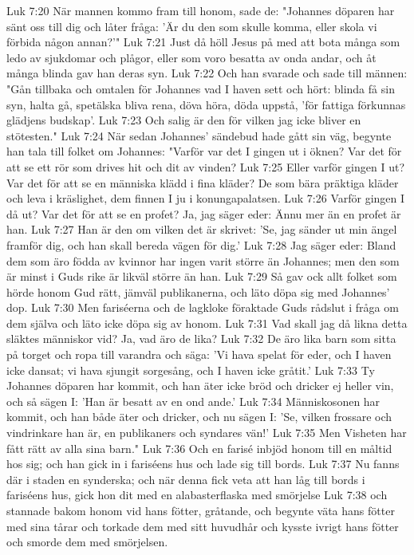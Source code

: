 Luk 7:20  När mannen kommo fram till honom, sade de: "Johannes döparen har sänt oss till dig och låter fråga: 'Är du den som skulle komma, eller skola vi förbida någon annan?'"
Luk 7:21  Just då höll Jesus på med att bota många som ledo av sjukdomar och plågor, eller som voro besatta av onda andar, och åt många blinda gav han deras syn.
Luk 7:22  Och han svarade och sade till männen: "Gån tillbaka och omtalen för Johannes vad I haven sett och hört: blinda få sin syn, halta gå, spetälska bliva rena, döva höra, döda uppstå, 'för fattiga förkunnas glädjens budskap'.
Luk 7:23  Och salig är den för vilken jag icke bliver en stötesten."
Luk 7:24  När sedan Johannes' sändebud hade gått sin väg, begynte han tala till folket om Johannes: "Varför var det I gingen ut i öknen? Var det för att se ett rör som drives hit och dit av vinden?
Luk 7:25  Eller varför gingen I ut? Var det för att se en människa klädd i fina kläder? De som bära präktiga kläder och leva i kräslighet, dem finnen I ju i konungapalatsen.
Luk 7:26  Varför gingen I då ut? Var det för att se en profet? Ja, jag säger eder: Ännu mer än en profet är han.
Luk 7:27  Han är den om vilken det är skrivet: 'Se, jag sänder ut min ängel framför dig, och han skall bereda vägen för dig.'
Luk 7:28  Jag säger eder: Bland dem som äro födda av kvinnor har ingen varit större än Johannes; men den som är minst i Guds rike är likväl större än han.
Luk 7:29  Så gav ock allt folket som hörde honom Gud rätt, jämväl publikanerna, och läto döpa sig med Johannes' dop.
Luk 7:30  Men fariséerna och de lagkloke föraktade Guds rådslut i fråga om dem själva och läto icke döpa sig av honom.
Luk 7:31  Vad skall jag då likna detta släktes människor vid? Ja, vad äro de lika?
Luk 7:32  De äro lika barn som sitta på torget och ropa till varandra och säga: 'Vi hava spelat för eder, och I haven icke dansat; vi hava sjungit sorgesång, och I haven icke gråtit.'
Luk 7:33  Ty Johannes döparen har kommit, och han äter icke bröd och dricker ej heller vin, och så sägen I: 'Han är besatt av en ond ande.'
Luk 7:34  Människosonen har kommit, och han både äter och dricker, och nu sägen I: 'Se, vilken frossare och vindrinkare han är, en publikaners och syndares vän!'
Luk 7:35  Men Visheten har fått rätt av alla sina barn."
Luk 7:36  Och en farisé inbjöd honom till en måltid hos sig; och han gick in i fariséens hus och lade sig till bords.
Luk 7:37  Nu fanns där i staden en synderska; och när denna fick veta att han låg till bords i fariséens hus, gick hon dit med en alabasterflaska med smörjelse
Luk 7:38  och stannade bakom honom vid hans fötter, gråtande, och begynte väta hans fötter med sina tårar och torkade dem med sitt huvudhår och kysste ivrigt hans fötter och smorde dem med smörjelsen.
